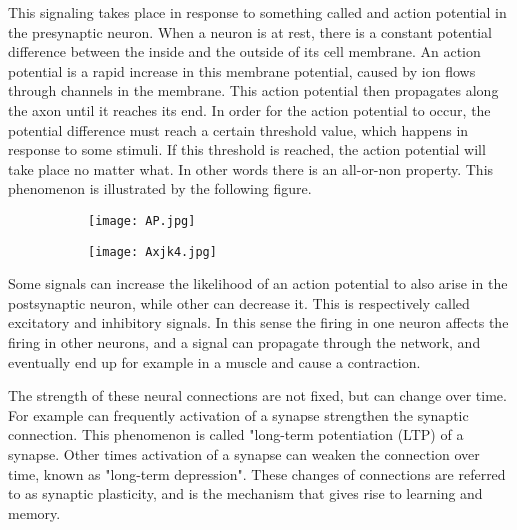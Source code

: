 
This signaling takes place in response to something called and action potential in the presynaptic neuron. When a neuron is at rest, there is a constant potential difference between the inside and the outside of its cell membrane. An action potential is a rapid increase in this membrane potential, caused by ion flows through channels in the membrane. This action potential then propagates along the axon until it reaches its end. In order for the action potential to occur, the potential difference must reach a certain threshold value, which happens in response to some stimuli. If this threshold is reached, the action potential will take place no matter what. In other words there is an all-or-non property. This phenomenon is illustrated by the following figure.

\begin{figure}[h]
\begin{subfigure}
\centering
\texttt{[image: AP.jpg]}
\end{subfigure}
\begin{subfigure}
\centering
\texttt{[image: Axjk4.jpg]}
\end{subfigure}
\end{figure} 

Some signals can increase the likelihood of an action potential to also arise in the postsynaptic neuron, while other can decrease it. This is respectively called excitatory and inhibitory signals. In this sense the firing in one neuron affects the firing in other neurons, and a signal can propagate through the network, and eventually end up for example in a muscle and cause a contraction. 

The  strength of these neural connections are not fixed, but can change over time. For example can frequently activation of a synapse strengthen the synaptic connection. This phenomenon is called "long-term potentiation (LTP) of a synapse. Other times activation of a synapse can weaken the connection over time, known as "long-term depression". These changes of connections are referred to as synaptic plasticity, and is the mechanism that gives rise to learning and memory. \\


